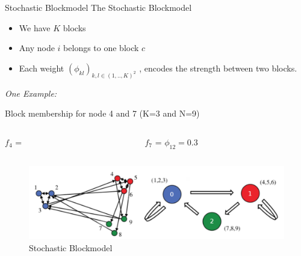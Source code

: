 \begin{frame}[t]{Stochastic Blockmodel}
    The Stochastic Blockmodel 

    \begin{itemize}
        \item We have $K$ blocks
        \item Any node $i$ belongs to one block $c$
        \item Each weight $(\phi_{kl})_{k,l \in (1, .., K)^2}$ ,  encodes the strength between two blocks.
    \end{itemize}

    \vspace{1em}
    \emph{One Example:}

    \begin{block}{Block membership for node 4 and 7 (K=3 and N=9)}

    \begin{columns}[t]
        \begin{column}{0.45\textwidth}
        $f_4$ = \raisebox{-2pt}{}
        \end{column}
        \begin{column}{0.45\textwidth}
            \hspace{-1.5cm}
        $f_7$ = \raisebox{-2pt}{}
            \hspace{0.5cm}
        $\phi_{12} = 0.3$
        \end{column}
    \end{columns}

    \end{block}

    \begin{figure}[h]
    \includegraphics[scale=0.3]{img/sb}
        \caption{Stochastic Blockmodel}
    \end{figure}
    
\end{frame}

